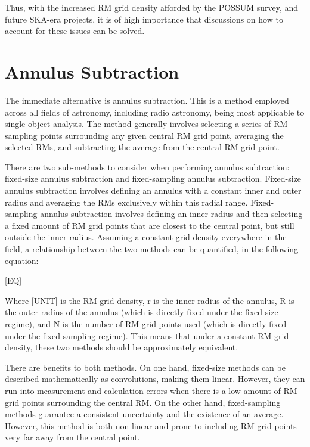 Thus, with the increased RM grid density afforded by the POSSUM survey, and future SKA-era projects, it is of high importance that discussions on how to account for these issues can be solved.

\section{Annulus Subtraction}
\label{sec:annulus}

The immediate alternative is annulus subtraction. This is a method employed across all fields of astronomy, including radio astronomy, being most applicable to single-object analysis. The method generally involves selecting a series of RM sampling points surrounding any given central RM grid point, averaging the selected RMs, and subtracting the average from the central RM grid point.

There are two sub-methods to consider when performing annulus subtraction: fixed-size annulus subtraction and fixed-sampling annulus subtraction. Fixed-size annulus subtraction involves defining an annulus with a constant inner and outer radius and averaging the RMs exclusively within this radial range. Fixed-sampling annulus subtraction involves defining an inner radius and then selecting a fixed amount of RM grid points that are closest to the central point, but still outside the inner radius. Assuming a constant grid density everywhere in the field, a relationship between the two methods can be quantified, in the following equation:


[EQ]


Where [UNIT] is the RM grid density, r is the inner radius of the annulus, R is the outer radius of the annulus (which is directly fixed under the fixed-size regime), and N is the number of RM grid points used (which is directly fixed under the fixed-sampling regime). This means that under a constant RM grid density, these two methods should be approximately equivalent.


There are benefits to both methods. On one hand, fixed-size methods can be described mathematically as convolutions, making them linear. However, they can run into measurement and calculation errors when there is a low amount of RM grid points surrounding the central RM. On the other hand, fixed-sampling methods guarantee a consistent uncertainty and the existence of an average. However, this method is both non-linear and prone to including RM grid points very far away from the central point.


